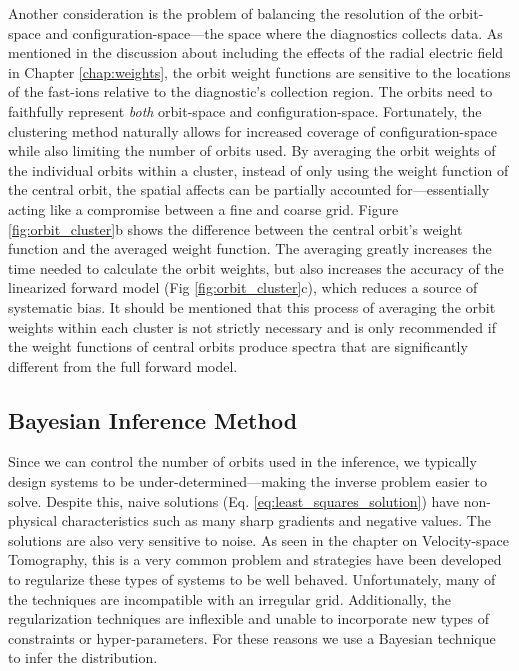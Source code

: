 Another consideration is the problem of balancing the resolution of the orbit-space and configuration-space---the space where the diagnostics collects data.
As mentioned in the discussion about including the effects of the radial electric field in Chapter \ref{chap:weights}, the orbit weight functions are sensitive to the locations of the fast-ions relative to the diagnostic's collection region.
The orbits need to faithfully represent \textit{both} orbit-space and configuration-space.
Fortunately, the clustering method naturally allows for increased coverage of configuration-space while also limiting the number of orbits used.
By averaging the orbit weights of the individual orbits within a cluster, instead of only using the weight function of the central orbit, the spatial affects can be partially accounted for---essentially acting like a compromise between a fine and coarse grid. Figure \ref{fig:orbit_cluster}b shows the difference between the central orbit's weight function and the averaged weight function.
The averaging greatly increases the time needed to calculate the orbit weights, but also increases the accuracy of the linearized forward model (Fig \ref{fig:orbit_cluster}c), which reduces a source of systematic bias.
It should be mentioned that this process of averaging the orbit weights within each cluster is not strictly necessary and is only recommended if the weight functions of central orbits produce spectra that are significantly different from the full forward model.

\subsection{Bayesian Inference Method}
Since we can control the number of orbits used in the inference, we typically design systems to be under-determined---making the inverse problem easier to solve.
Despite this, naive solutions (Eq. \ref{eq:least_squares_solution}) have non-physical characteristics such as many sharp gradients and negative values. The solutions are also very sensitive to noise.
As seen in the chapter on Velocity-space Tomography, this is a very common problem and strategies have been developed to regularize these types of systems to be well behaved. Unfortunately, many of the techniques are incompatible with an irregular grid.
Additionally, the regularization techniques are inflexible and unable to incorporate new types of constraints or hyper-parameters. For these reasons we use a Bayesian technique to infer the distribution.


